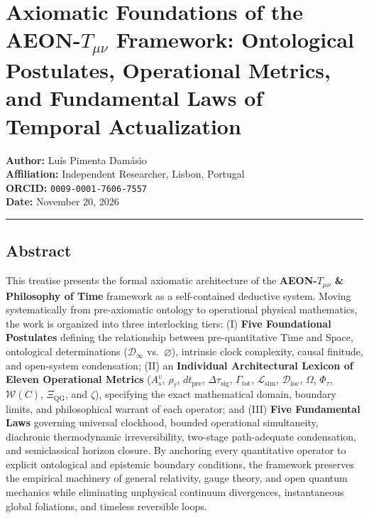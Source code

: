 \documentclass[
]{article}
\author{}
\date{}
\begin{document}
\section{\texorpdfstring{Axiomatic Foundations of the
AEON-\(T_{\mu\nu}\) Framework: Ontological Postulates, Operational
Metrics, and Fundamental Laws of Temporal
Actualization}{Axiomatic Foundations of the AEON-T\_\{\textbackslash mu\textbackslash nu\} Framework: Ontological Postulates, Operational Metrics, and Fundamental Laws of Temporal Actualization}}\label{axiomatic-foundations-of-the-aeon-t_munu-framework-ontological-postulates-operational-metrics-and-fundamental-laws-of-temporal-actualization}

\textbf{Author:} Luís Pimenta Damásio\\
\textbf{Affiliation:} Independent Researcher, Lisbon, Portugal\\
\textbf{ORCID:} \texttt{0009-0001-7606-7557}\\
\textbf{Date:} November 20, 2026

\begin{center}\rule{0.5\linewidth}{0.5pt}\end{center}

\subsection{Abstract}\label{abstract}

This treatise presents the formal axiomatic architecture of the
\textbf{AEON-\(T_{\mu\nu}\) \& Philosophy of Time} framework as a
self-contained deductive system. Moving systematically from
pre-axiomatic ontology to operational physical mathematics, the work is
organized into three interlocking tiers: (I) \textbf{Five Foundational
Postulates} defining the relationship between pre-quantitative Time and
Space, ontological determinations (\(\mathcal{D}_\infty\)
vs.~\(\varnothing\)), intrinsic clock complexity, causal finitude, and
open-system condensation; (II) an \textbf{Individual Architectural
Lexicon of Eleven Operational Metrics} (\(A_s^v\), \(\rho_\tau\),
\(dt_{\mathrm{pre}}\), \(\Delta\tau_{\mathrm{sig}}\),
\(\Gamma_{\mathrm{tot}}\), \(\mathcal{L}_{\mathrm{sim}}\),
\(\mathcal{D}_{\mathrm{loc}}\), \(\Omega\), \(\Phi_\tau\),
\(\mathcal{W}(C)\), \(\Xi_{\mathrm{QG}}\), and \(\zeta\)), specifying
the exact mathematical domain, boundary limits, and philosophical
warrant of each operator; and (III) \textbf{Five Fundamental Laws}
governing universal clockhood, bounded operational simultaneity,
diachronic thermodynamic irreversibility, two-stage path-adequate
condensation, and semiclassical horizon closure. By anchoring every
quantitative operator to explicit ontological and epistemic boundary
conditions, the framework preserves the empirical machinery of general
relativity, gauge theory, and open quantum mechanics while eliminating
unphysical continuum divergences, instantaneous global foliations, and
timeless reversible loops.
\end{document}
